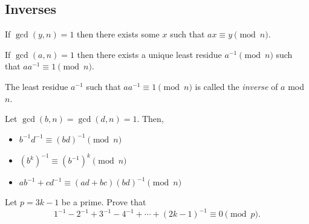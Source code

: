 \subsection{Inverses}
\begin{result}{\label{r:i:n:i:1}}
    If $\gcd(y,n)=1$ then there exists some $x$ such that $ax\equiv y\pmod n$.
\end{result}
\begin{result}{\label{r:i:n:i:2}}
    If $\gcd(a,n)=1$ then there exists a unique least residue $a^{-1}\pmod n$
    such that $aa^{-1}\equiv 1\pmod n$.
\end{result}
The least residue $a^{-1}$ such that $aa^{-1}\equiv 1\pmod n$ is called the \emph{inverse} of
  $a$ mod $n$.
\begin{result}{\label{r:i:n:i:3}}
  Let $\gcd(b,n)=\gcd(d,n)=1$. Then,
  \begin{itemize}
    \item $b^{-1}d^{-1}\equiv (bd)^{-1}\pmod n$
    \item $(b^k)^{-1}\equiv (b^{-1})^k\pmod n$
    \item $ab^{-1}+cd^{-1}\equiv (ad+bc)(bd)^{-1}\pmod n$
  \end{itemize}
\end{result}
\begin{problem}{\label{p:i:n:i:1}}
  Let $p=3k-1$ be a prime. Prove that
    \[1^{-1}-2^{-1}+3^{-1}-4^{-1}+\cdots+(2k-1)^{-1}\equiv 0\pmod p.\]
\end{problem}
